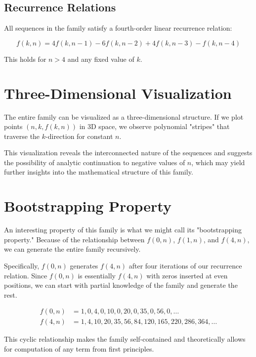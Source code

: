 \documentclass[12pt,a4paper]{article}
\begin{document}
\subsection{Recurrence Relations}

All sequences in the family satisfy a fourth-order linear recurrence relation:

\begin{equation}
f(k,n) = 4f(k,n-1) - 6f(k,n-2) + 4f(k,n-3) - f(k,n-4)
\end{equation}

This holds for $n > 4$ and any fixed value of $k$.

\section{Three-Dimensional Visualization}

The entire family can be visualized as a three-dimensional structure. If we plot points $(n, k, f(k,n))$ in 3D space, we observe polynomial "stripes" that traverse the $k$-direction for constant $n$.

This visualization reveals the interconnected nature of the sequences and suggests the possibility of analytic continuation to negative values of $n$, which may yield further insights into the mathematical structure of this family.

\section{Bootstrapping Property}

An interesting property of this family is what we might call its "bootstrapping property." Because of the relationship between $f(0,n)$, $f(1,n)$, and $f(4,n)$, we can generate the entire family recursively.

Specifically, $f(0,n)$ generates $f(4,n)$ after four iterations of our recurrence relation. Since $f(0,n)$ is essentially $f(4,n)$ with zeros inserted at even positions, we can start with partial knowledge of the family and generate the rest.

\begin{align}
f(0,n) &= 1, 0, 4, 0, 10, 0, 20, 0, 35, 0, 56, 0, \ldots \\
f(4,n) &= 1, 4, 10, 20, 35, 56, 84, 120, 165, 220, 286, 364, \ldots
\end{align}

This cyclic relationship makes the family self-contained and theoretically allows for computation of any term from first principles.
\end{document}
